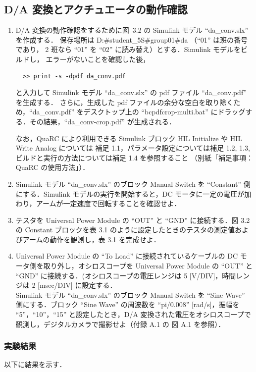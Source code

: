 \subsection{D/A 変換とアクチュエータの動作確認}
\begin{enumerate}
  \item D/A 変換の動作確認をするために図~3.2 の Simulink モデル ``da\_conv.slx'' を作成する．
        保存場所は D:\#student\_5S\#group01\#da （``01'' は班の番号であり，
        2 班なら ``01'' を ``02'' に読み替え）とする．Simulink モデルをビルドし，
        エラーがないことを確認した後，
        \begin{lstlisting}
  >> print -s -dpdf da_conv.pdf    
  \end{lstlisting}
        と入力して Simulink モデル ``da\_conv.slx'' の pdf ファイル ``da\_conv.pdf'' を生成する．
        さらに，生成した pdf ファイルの余分な空白を取り除くため，``da\_conv.pdf'' をデスクトップ上の
        ``bcpdfcrop-multi.bat'' にドラッグする．その結果，``da\_conv-crop.pdf'' が生成される．
        
        なお，QuaRC により利用できる Simulink ブロック HIL Initialize や HIL Write Analog については
        補足 1.1，パラメータ設定については補足 1.2, 1.3, ビルドと実行の方法については補足 1.4 を参照すること
        （別紙「補足事項：QuaRC の使用方法」）．
  \item Simulink モデル “da\_conv.slx” のブロック Manual Switch を “Constant” 側にする．Simulink モデルの実行を開始すると，DC モータに一定の電圧が加わり，アームが一定速度で回転することを確認せよ．
  \item テスタを Universal Power Module の “OUT” と “GND” に接続する．図 3.2 の Constant ブロックを表 3.1 のように設定したときのテスタの測定値およびアームの動作を観測し，表 3.1 を完成せよ．
  \item Universal Power Module の “To Load” に接続されているケーブルの DC モータ側を取り外し，オシロスコープを Universal Power Module の “OUT” と “GND” に接続する．(オシロスコープの電圧レンジは 5 [V/DIV]，時間レンジは 2 [msec/DIV] に設定する．\\
        \quad Simulink モデル “da\_conv.slx” のブロック Manual Switch を “Sine Wave” 側にする．ブロック “Sine Wave” の周波数を “pi/0.008” [rad/s]，振幅を “5”，“10”，“15” と設定したとき，D/A 変換された電圧をオシロスコープで観測し，デジタルカメラで撮影せよ（付録 A.1 の 図 A.1 を参照）．
\end{enumerate}

\subsubsection{実験結果}
以下に結果を示す．

